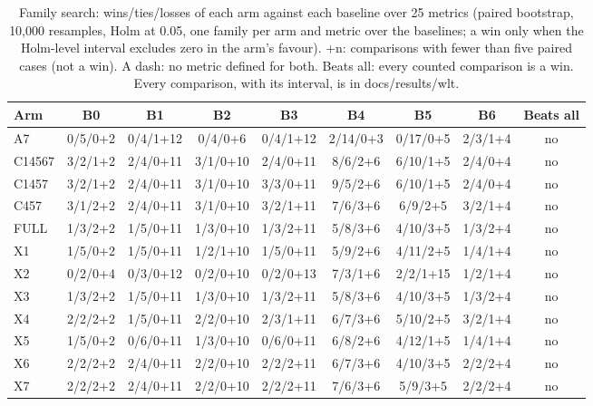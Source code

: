\begin{table}[!t]
\centering\small
\begin{adjustbox}{max width=\textwidth}
\begin{tabular}{@{}lcccccccc@{}}
\toprule
Arm & B0 & B1 & B2 & B3 & B4 & B5 & B6 & Beats all \\
\midrule
A7 & 0/5/0+2 & 0/4/1+12 & 0/4/0+6 & 0/4/1+12 & 2/14/0+3 & 0/17/0+5 & 2/3/1+4 & no \\
C14567 & 3/2/1+2 & 2/4/0+11 & 3/1/0+10 & 2/4/0+11 & 8/6/2+6 & 6/10/1+5 & 2/4/0+4 & no \\
C1457 & 3/2/1+2 & 2/4/0+11 & 3/1/0+10 & 3/3/0+11 & 9/5/2+6 & 6/10/1+5 & 2/4/0+4 & no \\
C457 & 3/1/2+2 & 2/4/0+11 & 3/1/0+10 & 3/2/1+11 & 7/6/3+6 & 6/9/2+5 & 3/2/1+4 & no \\
FULL & 1/3/2+2 & 1/5/0+11 & 1/3/0+10 & 1/3/2+11 & 5/8/3+6 & 4/10/3+5 & 1/3/2+4 & no \\
X1 & 1/5/0+2 & 1/5/0+11 & 1/2/1+10 & 1/5/0+11 & 5/9/2+6 & 4/11/2+5 & 1/4/1+4 & no \\
X2 & 0/2/0+4 & 0/3/0+12 & 0/2/0+10 & 0/2/0+13 & 7/3/1+6 & 2/2/1+15 & 1/2/1+4 & no \\
X3 & 1/3/2+2 & 1/5/0+11 & 1/3/0+10 & 1/3/2+11 & 5/8/3+6 & 4/10/3+5 & 1/3/2+4 & no \\
X4 & 2/2/2+2 & 1/5/0+11 & 2/2/0+10 & 2/3/1+11 & 6/7/3+6 & 5/10/2+5 & 3/2/1+4 & no \\
X5 & 1/5/0+2 & 0/6/0+11 & 1/3/0+10 & 0/6/0+11 & 6/8/2+6 & 4/12/1+5 & 1/4/1+4 & no \\
X6 & 2/2/2+2 & 2/4/0+11 & 2/2/0+10 & 2/2/2+11 & 6/7/3+6 & 4/10/3+5 & 2/2/2+4 & no \\
X7 & 2/2/2+2 & 2/4/0+11 & 2/2/0+10 & 2/2/2+11 & 7/6/3+6 & 5/9/3+5 & 2/2/2+4 & no \\
\bottomrule
\end{tabular}
\end{adjustbox}
\caption{Family search: wins/ties/losses of each arm against each baseline over 25 metrics (paired bootstrap, 10,000 resamples, Holm at 0.05, one family per arm and metric over the baselines; a win only when the Holm-level interval excludes zero in the arm's favour). +n: comparisons with fewer than five paired cases (not a win). A dash: no metric defined for both. Beats all: every counted comparison is a win. Every comparison, with its interval, is in docs/results/wlt.}
\label{tab:wlt_search}
\end{table}
